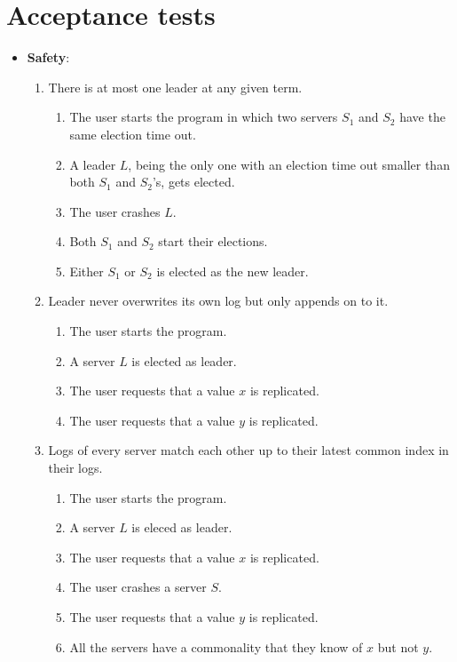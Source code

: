 \section{Acceptance tests}
\label{sec:tests}
\begin{itemize}
\item \textbf{Safety}:
    \begin{enumerate}
    \item There is at most one leader at any given term.
        \begin{enumerate}
        \item The user starts the program in which two servers $S_1$ and $S_2$ have the same election time out.
        \item A leader $L$, being the only one with an election time out smaller than both $S_1$ and $S_2$'s, gets elected.
        \item The user crashes $L$.
        \item Both $S_1$ and $S_2$ start their elections.
        \item Either $S_1$ or $S_2$ is elected as the new leader.
        \end{enumerate}
    \item Leader never overwrites its own log but only appends on to it.
        \begin{enumerate}
        \item The user starts the program.
        \item A server $L$ is elected as leader.
        \item The user requests that a value $x$ is replicated.
        \item The user requests that a value $y$ is replicated.%
        \end{enumerate}
    \item Logs of every server match each other up to their latest common index in their logs.
        \begin{enumerate}
        \item The user starts the program.
        \item A server $L$ is eleced as leader.
        \item The user requests that a value $x$ is replicated.
        \item The user crashes a server $S$.
        \item The user requests that a value $y$ is replicated.
        \item All the servers have a commonality that they know of $x$ but not $y$.

\end{enumerate}
\end{enumerate}
\end{itemize}
